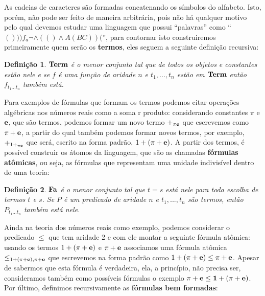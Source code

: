 \documentclass[11pt,a4paper]{article}
\newtheorem{mydef}{Definição}[section]
\theoremstyle{definition}
\begin{document}
As cadeias de caracteres são formadas concatenando os símbolos do alfabeto. Isto, porém, não pode ser feito de maneira arbitrária, pois não há qualquer motivo pelo qual devemos estudar uma linguagem que possui ``palavras'' como ``$()))f_a\neg \wedge(() \wedge A(BC))($'', para contornar isto construiremos primeiramente quem serão os \textbf{termos}, eles seguem a seguinte definição recursiva: 

\begin{mydef}
	
	$\textrm{\textbf{Term}}$ é o menor conjunto tal que de todos os objetos e constantes estão nele e se $f$ é uma função de aridade $n$ e $t_1,...,t_n$ estão em $\textrm{\textbf{Term}}$ então $f_{t_1...t_n}$ também está. 
	
\end{mydef}

Para exemplos de fórmulas que formam os termos podemos citar operações algébricas nos números reais como a soma r produto: considerando constantes $\pi$ e $\bf{e}$, que são termos, podemos formar um novo termo $+_{\pi \bf{e}}$ que escrevemos como $\pi+\bf{e}$, a partir do qual também podemos formar novos termos, por exemplo, $+_{1 +_{\pi \bf{e}}}$ que será, escrito na forma padrão, $1+(\pi+\bf{e})$. A partir dos termos, é possível construir os átomos da linguagem, que são as chamadas \textbf{fórmulas atômicas}, ou seja, as fórmulas que representam uma unidade indivisível dentro de uma teoria: 

\begin{mydef}
	
	$\textrm{\textbf{Fa}}$ é o menor conjunto tal que $t=s$ está nele para toda escolha de termos $t$ e $s$. Se $P$ é um predicado de aridade $n$ e $t_1,...,t_n$ são termos, então $P_{t_1...t_n}$ também está nele. 
	
\end{mydef}

Ainda na teoria dos números reais como exemplo, podemos considerar o predicado $\leq$ que tem aridade 2 e com ele montar a seguinte fórmula atômica: usando os termos $1+(\pi+\bf{e})$ e $\pi+\bf{e}$ associamos uma fórmula atômica $\leq_{1+(\pi+\bf{e}) , \pi+\bf{e}}$ que escrevemos na forma padrão como $1+(\pi+\bf{e})\leq \pi+\bf{e}$. Apesar de sabermos que esta fórmula é verdadeira, ela, a princípio, não precisa ser, consideramos também como possíveis fórmulas o exemplo $\pi+\bf{e}\leq 1+(\pi+\bf{e})$. Por último, definimos recursivamente as \textbf{fórmulas bem formadas}:
\end{document}
